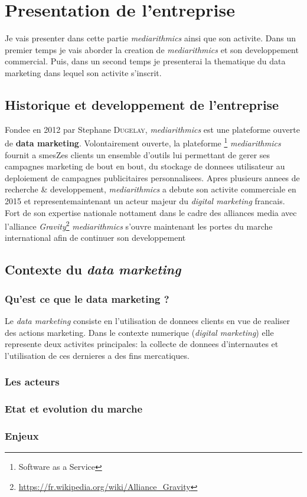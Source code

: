 \section{Presentation de l'entreprise}
    Je vais presenter dans cette partie \emph{mediarithmics} ainsi que son activite. Dans un premier temps je vais 
    aborder la creation de \emph{mediarithmics} et son developpement commercial. Puis, dans un second temps je 
    presenterai la thematique du data marketing dans lequel son activite s'inscrit.
    \subsection{Historique et developpement de l'entreprise}
        Fondee en 2012 par Stephane \textsc{Dugelay}, \emph{mediarithmics} est une plateforme ouverte de 
        \textbf{data marketing}. Volontairement ouverte, la plateforme \footnote{Software as a Service} 
        \emph{mediarithmics} fournit a smesZes clients un ensemble d'outils lui permettant de gerer ses campagnes marketing 
        de bout en bout, du stockage de donnees utilisateur au deploiement de campagnes publicitaires personnalisees.
        Apres plusieurs annees de recherche \& developpement, \emph{mediarithmics} a debute son activite commerciale en 
        2015 et representemaintenant un acteur majeur du \emph{digital marketing} francais. Fort de son expertise nationale nottament dans le cadre des alliances media avec l'alliance \emph{Gravity}\footnote{\url{https://fr.wikipedia.org/wiki/Alliance\_Gravity}} \emph{mediarithmics} s'ouvre maintenant les portes du marche international afin de continuer son developpement
    \subsection{Contexte du \emph{data marketing}}
        \subsubsection{Qu'est ce que le data marketing ?}
        Le \emph{data marketing} consiste en l'utilisation de donnees clients en vue de realiser des actions marketing. 
        Dans le contexte numerique (\emph{digital marketing}) elle represente deux activites principales: la collecte de
        donnees d'internautes et l'utilisation de ces dernieres a des fins mercatiques.
        \subsubsection{Les acteurs}
        \subsubsection{Etat et evolution du marche}
        \subsubsection{Enjeux}
    



